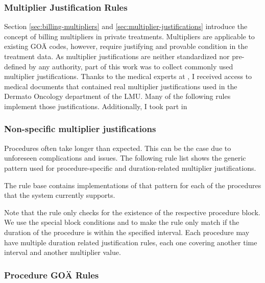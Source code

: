 \subsubsection{Multiplier Justification Rules}\label{subsubsec:multiplier-justification-rules}
Section \ref{sec:billing-multipliers} and \ref{sec:multiplier-justifications} introduce the concept of billing multipliers in private treatments.
Multipliers are applicable to existing GOÄ codes, however, require justifying and provable condition in the treatment data.
As multiplier justifications are neither standardized nor pre-defined by any authority,
part of this work was to collect commonly used multiplier justifications.
Thanks to the medical experts at \AV, I received access to medical documents that contained real multiplier justifications used in the Dermato Oncology department of the LMU.
Many of the following rules implement those justifications.
Additionally, I took part in 


\subsubsection{Non-specific multiplier justifications}



Procedures often take longer than expected.
This can be the case due to unforeseen complications and issues.
The following rule list shows the generic pattern used for procedure-specific and duration-related multiplier justifications.



The rule base contains implementations of that pattern for each of the procedures that the system currently supports.

Note that the rule only checks for the existence of the respective procedure block.
We use the special block conditions  and  to make the rule only match if the duration of the procedure is within the specified interval.
Each procedure may have multiple duration related justification rules, each one covering another time interval and another multiplier value.





\subsubsection{Procedure GOÄ Rules}
